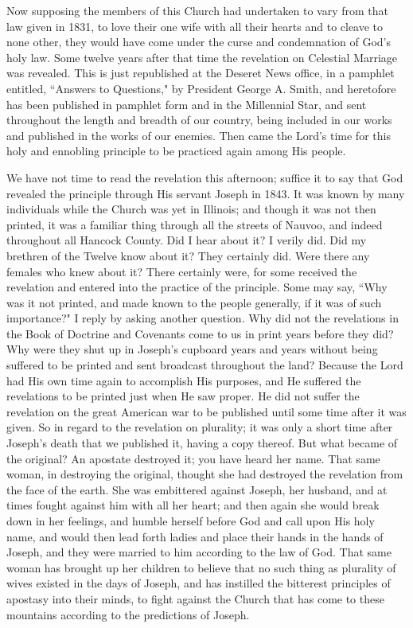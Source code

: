 Now supposing the members of this Church had undertaken to vary from that law given in 1831, to love their one wife with all their hearts and to cleave to none other, they would have come under the curse and condemnation of God's holy law. Some twelve years after that time the revelation on Celestial Marriage was revealed. This is just republished at the Deseret News office, in a pamphlet entitled, ``Answers to Questions," by President George A. Smith, and heretofore has been published in pamphlet form and in the Millennial Star, and sent throughout the length and breadth of our country, being included in our works and published in the works of our enemies. Then came the Lord's time for this holy and ennobling principle to be practiced again among His people.

We have not time to read the revelation this afternoon; suffice it to say that God revealed the principle through His servant Joseph in 1843. It was known by many individuals while the Church was yet in Illinois; and though it was not then printed, it was a familiar thing through all the streets of Nauvoo, and indeed throughout all Hancock County. Did I hear about it? I verily did. Did my brethren of the Twelve know about it? They certainly did. Were there any females who knew about it? There certainly were, for some received the revelation and entered into the practice of the principle. Some may say, ``Why was it not printed, and made known to the people generally, if it was of such importance?" I reply by asking another question. Why did not the revelations in the Book of Doctrine and Covenants come to us in print years before they did? Why were they shut up in Joseph's cupboard years and years without being suffered to be printed and sent broadcast throughout the land? Because the Lord had His own time again to accomplish His purposes, and He suffered the revelations to be printed just when He saw proper. He did not suffer the revelation on the great American war to be published until some time after it was given. So in regard to the revelation on plurality; it was only a short time after Joseph's death that we published it, having a copy thereof. But what became of the original? An apostate destroyed it; you have heard her name. That same woman, in destroying the original, thought she had destroyed the revelation from the face of the earth. She was embittered against Joseph, her husband, and at times fought against him with all her heart; and then again she would break down in her feelings, and humble herself before God and call upon His holy name, and would then lead forth ladies and place their hands in the hands of Joseph, and they were married to him according to the law of God. That same woman has brought up her children to believe that no such thing as plurality of wives existed in the days of Joseph, and has instilled the bitterest principles of apostasy into their minds, to fight against the Church that has come to these mountains according to the predictions of Joseph.